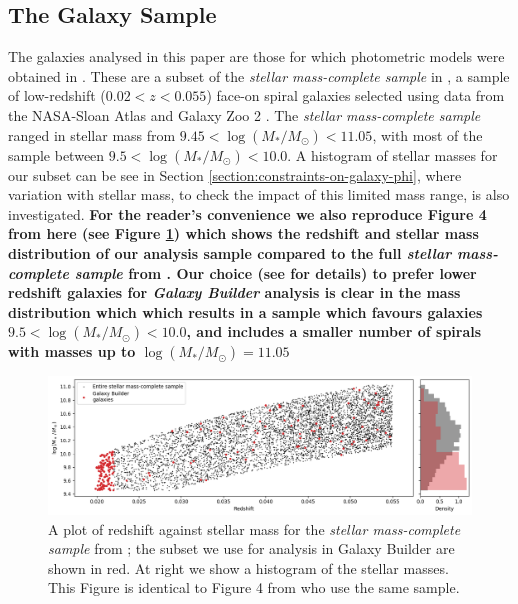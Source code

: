 \subsection{The Galaxy Sample}
The galaxies analysed in this paper are those for which photometric models were obtained in \citet{2020arXiv200610450L}. These are a subset of the \textit{stellar mass-complete sample} in \citet{2017MNRAS.472.2263H}, a sample of low-redshift ($0.02 < z < 0.055$) face-on spiral galaxies selected using data from the NASA-Sloan Atlas \citep{2011AJ....142...31B} and Galaxy Zoo 2 \citep{Willett2013:1308.3496v2}. The \textit{stellar mass-complete sample} ranged in stellar mass from $9.45 < \log(M_* / M_\odot) < 11.05$, with most of the sample between $9.5 < \log(M_* / M_\odot) < 10.0$. A histogram of stellar masses for our subset can be see in Section \ref{section:constraints-on-galaxy-phi}, where variation with stellar mass, to check the impact of this limited mass range, is also investigated. {\bf For the reader's convenience we also reproduce Figure 4 from \citet{2020arXiv200610450L} here (see Figure \ref{fig:stellarmass}) which shows the redshift and stellar mass distribution of our analysis sample compared to the full \textit{stellar mass-complete sample} from \citet{2017MNRAS.472.2263H}. Our choice (see \citet{2020arXiv200610450L} for details) to prefer lower redshift galaxies for {\it Galaxy Builder} analysis is clear in the mass distribution which which results in a sample which favours galaxies $9.5 < \log(M_* / M_\odot) < 10.0$, and includes a smaller number of spirals with masses up to  $\log(M_* / M_\odot) = 11.05$}

\begin{figure}
  \includegraphics[width=17.7cm]{plots/stellarmass.png}
  \caption{A plot of redshift against stellar mass for the \textit{stellar mass-complete sample} from \citet{2017MNRAS.472.2263H}; the subset we use for analysis in Galaxy Builder are shown in red. At right we show a histogram of the stellar masses. This Figure is identical to Figure 4 from \citet{2020arXiv200610450L} who use the same sample.}
  \label{fig:stellarmass}
\end{figure}

